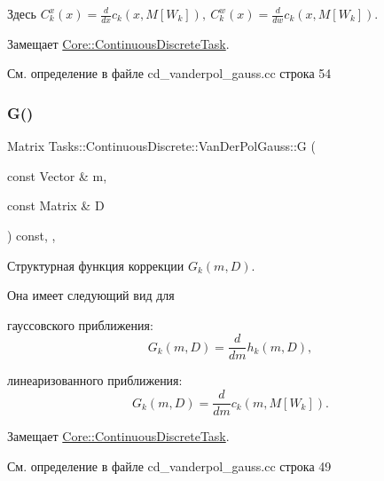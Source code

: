 Здесь $C_k^x(x) = \frac{d}{dx} c_k(x, M[W_k]),\ C_k^w(x) = \frac{d}{dw} c_k(x, M[W_k])$. 

Замещает \hyperlink{class_core_1_1_continuous_discrete_task_a08947ea4d4eb819e0e8530e682a1a377}{Core\+::\+Continuous\+Discrete\+Task}.



См. определение в файле cd\+\_\+vanderpol\+\_\+gauss.\+cc строка 54

\hypertarget{class_tasks_1_1_continuous_discrete_1_1_van_der_pol_gauss_a757eb311b72b3cabcee59eab9d732de5}{}\label{class_tasks_1_1_continuous_discrete_1_1_van_der_pol_gauss_a757eb311b72b3cabcee59eab9d732de5} 
\subsubsection{\texorpdfstring{G()}{G()}}
{\footnotesize\ttfamily Matrix Tasks\+::\+Continuous\+Discrete\+::\+Van\+Der\+Pol\+Gauss\+::G (\begin{DoxyParamCaption}\item[{const Vector \&}]{m,  }\item[{const Matrix \&}]{D }\end{DoxyParamCaption}) const\hspace{0.3cm}{\ttfamily [override]}, {\ttfamily [protected]}, {\ttfamily [virtual]}}



Структурная функция коррекции $G_k(m, D)$. 

Она имеет следующий вид для


\begin{DoxyItemize}
\item гауссовского приближения\+: \[G_k(m, D) = \frac{d}{dm}h_k(m,D),\]
\item линеаризованного приближения\+: \[G_k(m, D) = \frac{d}{dm}c_k(m,M[W_k]).\] 
\end{DoxyItemize}

Замещает \hyperlink{class_core_1_1_continuous_discrete_task_a2bc6d34d112ec0999857f7f9e0f67dda}{Core\+::\+Continuous\+Discrete\+Task}.



См. определение в файле cd\+\_\+vanderpol\+\_\+gauss.\+cc строка 49

\hypertarget{class_tasks_1_1_continuous_discrete_1_1_van_der_pol_gauss_acfe935d9f4f452f3e10cb5f41fc8530a}{}\label{class_tasks_1_1_continuous_discrete_1_1_van_der_pol_gauss_acfe935d9f4f452f3e10cb5f41fc8530a} 
